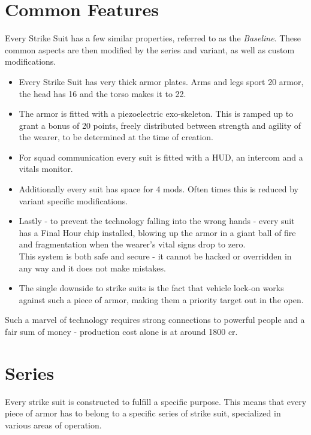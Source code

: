 \documentclass[12pt,a4paper,openany]{book}
\begin{document}
	\section{Common Features}
	Every Strike Suit has a few similar properties, referred to as the \emph{Baseline}. These common aspects are then modified by the series and variant, as well as custom modifications.\par
	\begin{itemize}
		\item Every Strike Suit has very thick armor plates. Arms and legs sport 20 armor, the head has 16 and the torso makes it to 22.
		\item The armor is fitted with a piezoelectric exo-skeleton. This is ramped up to grant a bonus of 20 points, freely distributed between strength and agility of the wearer, to be determined at the time of creation.
		\item For squad communication every suit is fitted with a HUD, an intercom and a vitals monitor.
		\item Additionally every suit has space for 4 mods. Often times this is reduced by variant specific modifications.
		\item Lastly - to prevent the technology falling into the wrong hands - every suit has a Final Hour chip installed, blowing up the armor in a giant ball of fire and fragmentation when the wearer's vital signs drop to zero.\\
		This system is both safe and secure - it cannot be hacked or overridden in any way and it does not make mistakes.
		\item The single downside to strike suits is the fact that vehicle lock-on works against such a piece of armor, making them a priority target out in the open.
	\end{itemize}
	\par
	Such a marvel of technology requires strong connections to powerful people and a fair sum of money - production cost alone is at around 1800 cr.

	\section{Series}
	Every strike suit is constructed to fulfill a specific purpose. This means that every piece of armor has to belong to a specific series of strike suit, specialized in various areas of operation.
\end{document}
